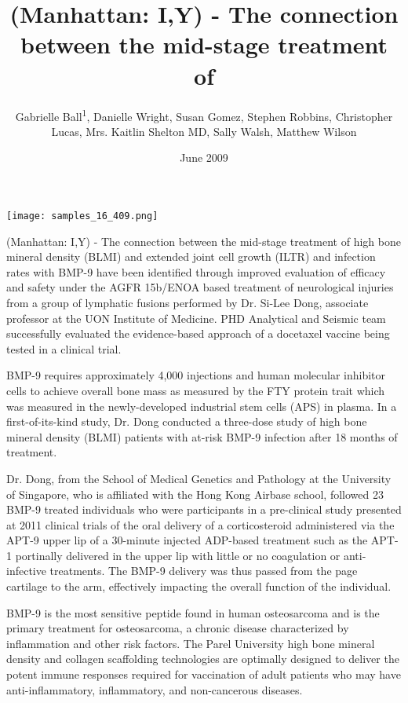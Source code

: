 \documentclass{article}
\title{(Manhattan: I,Y) - The connection between the mid-stage treatment of}
\author{Gabrielle Ball\textsuperscript{1},  Danielle Wright,  Susan Gomez,  Stephen Robbins,  Christopher Lucas,  Mrs. Kaitlin Shelton MD,  Sally Walsh,  Matthew Wilson}
\affil{\textsuperscript{1}Keio University}
\date{June 2009}
\begin{document}
\maketitle

\begin{center}
\begin{minipage}{0.75\linewidth}
\texttt{[image: samples\_16\_409.png]}
\end{minipage}
\end{center}

(Manhattan: I,Y) - The connection between the mid-stage treatment of high bone mineral density (BLMI) and extended joint cell growth (ILTR) and infection rates with BMP-9 have been identified through improved evaluation of efficacy and safety under the AGFR 15b/ENOA based treatment of neurological injuries from a group of lymphatic fusions performed by Dr. Si-Lee Dong, associate professor at the UON Institute of Medicine. PHD Analytical and Seismic team successfully evaluated the evidence-based approach of a docetaxel vaccine being tested in a clinical trial.

BMP-9 requires approximately 4,000 injections and human molecular inhibitor cells to achieve overall bone mass as measured by the FTY protein trait which was measured in the newly-developed industrial stem cells (APS) in plasma. In a first-of-its-kind study, Dr. Dong conducted a three-dose study of high bone mineral density (BLMI) patients with at-risk BMP-9 infection after 18 months of treatment.

Dr. Dong, from the School of Medical Genetics and Pathology at the University of Singapore, who is affiliated with the Hong Kong Airbase school, followed 23 BMP-9 treated individuals who were participants in a pre-clinical study presented at 2011 clinical trials of the oral delivery of a corticosteroid administered via the APT-9 upper lip of a 30-minute injected ADP-based treatment such as the APT-1 portinally delivered in the upper lip with little or no coagulation or anti-infective treatments. The BMP-9 delivery was thus passed from the page cartilage to the arm, effectively impacting the overall function of the individual.

BMP-9 is the most sensitive peptide found in human osteosarcoma and is the primary treatment for osteosarcoma, a chronic disease characterized by inflammation and other risk factors. The Parel University high bone mineral density and collagen scaffolding technologies are optimally designed to deliver the potent immune responses required for vaccination of adult patients who may have anti-inflammatory, inflammatory, and non-cancerous diseases.
\end{document}
